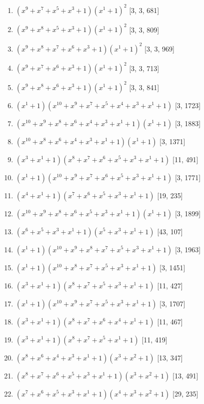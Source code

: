 \documentclass[10pt,twocolumn]{article}
\begin{document}
\begin{enumerate}
\item $(x^{9} + x^{7} + x^{5} + x^{3} + 1)(x^{1} + 1)^{2}$  [3, 3, 681]
\item $(x^{9} + x^{8} + x^{5} + x^{3} + 1)(x^{1} + 1)^{2}$  [3, 3, 809]
\item $(x^{9} + x^{8} + x^{7} + x^{6} + x^{3} + 1)(x^{1} + 1)^{2}$  [3, 3, 969]
\item $(x^{9} + x^{7} + x^{6} + x^{3} + 1)(x^{1} + 1)^{2}$  [3, 3, 713]
\item $(x^{9} + x^{8} + x^{6} + x^{3} + 1)(x^{1} + 1)^{2}$  [3, 3, 841]
\item $(x^{1} + 1)(x^{10} + x^{9} + x^{7} + x^{5} + x^{4} + x^{3} + x^{1} + 1)$  [3, 1723]
\item $(x^{10} + x^{9} + x^{8} + x^{6} + x^{4} + x^{3} + x^{1} + 1)(x^{1} + 1)$  [3, 1883]
\item $(x^{10} + x^{8} + x^{6} + x^{4} + x^{3} + x^{1} + 1)(x^{1} + 1)$  [3, 1371]
\item $(x^{3} + x^{1} + 1)(x^{8} + x^{7} + x^{6} + x^{5} + x^{3} + x^{1} + 1)$  [11, 491]
\item $(x^{1} + 1)(x^{10} + x^{9} + x^{7} + x^{6} + x^{5} + x^{3} + x^{1} + 1)$  [3, 1771]
\item $(x^{4} + x^{1} + 1)(x^{7} + x^{6} + x^{5} + x^{3} + x^{1} + 1)$  [19, 235]
\item $(x^{10} + x^{9} + x^{8} + x^{6} + x^{5} + x^{3} + x^{1} + 1)(x^{1} + 1)$  [3, 1899]
\item $(x^{6} + x^{5} + x^{3} + x^{1} + 1)(x^{5} + x^{3} + x^{1} + 1)$  [43, 107]
\item $(x^{1} + 1)(x^{10} + x^{9} + x^{8} + x^{7} + x^{5} + x^{3} + x^{1} + 1)$  [3, 1963]
\item $(x^{1} + 1)(x^{10} + x^{8} + x^{7} + x^{5} + x^{3} + x^{1} + 1)$  [3, 1451]
\item $(x^{3} + x^{1} + 1)(x^{8} + x^{7} + x^{5} + x^{3} + x^{1} + 1)$  [11, 427]
\item $(x^{1} + 1)(x^{10} + x^{9} + x^{7} + x^{5} + x^{3} + x^{1} + 1)$  [3, 1707]
\item $(x^{3} + x^{1} + 1)(x^{8} + x^{7} + x^{6} + x^{4} + x^{1} + 1)$  [11, 467]
\item $(x^{3} + x^{1} + 1)(x^{8} + x^{7} + x^{5} + x^{1} + 1)$  [11, 419]
\item $(x^{8} + x^{6} + x^{4} + x^{3} + x^{1} + 1)(x^{3} + x^{2} + 1)$  [13, 347]
\item $(x^{8} + x^{7} + x^{6} + x^{5} + x^{3} + x^{1} + 1)(x^{3} + x^{2} + 1)$  [13, 491]
\item $(x^{7} + x^{6} + x^{5} + x^{3} + x^{1} + 1)(x^{4} + x^{3} + x^{2} + 1)$  [29, 235]

\end{enumerate}
\end{document}
